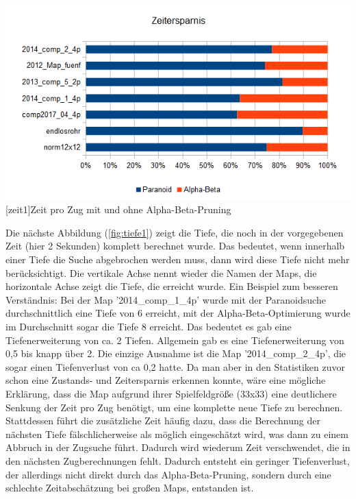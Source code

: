 \documentclass[12pt,a4paper,bibliography=totocnumbered,listof=totocnumbered]{scrartcl}
\begin{document}
    \vspace{1em}
    \begin{minipage}{\linewidth}
    	\centering
    	\includegraphics[width=1\linewidth]{pics/Kapitel_4/ZeitParaAlpha.png}
    	[zeit1]{Zeit pro Zug mit und ohne Alpha-Beta-Pruning}
    	\label{fig:zeit1}
    \end{minipage}
    \vspace{1em}
  
	 Die nächste Abbildung (\ref{fig:tiefe1}) zeigt die Tiefe, die noch in der vorgegebenen Zeit (hier 2 Sekunden) komplett berechnet wurde. Das bedeutet, wenn innerhalb einer Tiefe die Suche abgebrochen werden muss, dann wird diese Tiefe nicht mehr berücksichtigt. Die vertikale Achse nennt wieder die Namen der Maps, die horizontale Achse zeigt die Tiefe, die erreicht wurde. Ein Beispiel zum besseren Verständnis:\newline
	 Bei der Map '2014\_comp\_1\_4p' wurde mit der Paranoidsuche durchschnittlich eine Tiefe von 6 erreicht, mit der Alpha-Beta-Optimierung wurde im Durchschnitt sogar die Tiefe 8 erreicht. Das bedeutet es gab eine Tiefenerweiterung von ca. 2 Tiefen. \newline
	 Allgemein gab es eine Tiefenerweiterung von 0,5 bis knapp über 2.\newline
	 Die einzige Ausnahme ist die Map '2014\_comp\_2\_4p', die sogar einen Tiefenverlust von ca 0,2 hatte. Da man aber in den Statistiken zuvor schon eine Zustands- und Zeitersparnis erkennen konnte, wäre eine mögliche Erklärung, dass die Map aufgrund ihrer Spielfeldgröße (33x33) eine deutlichere Senkung der Zeit pro Zug benötigt, um eine komplette neue Tiefe zu berechnen. Stattdessen führt die zusätzliche Zeit häufig dazu, dass die Berechnung der nächsten Tiefe fälschlicherweise als möglich eingeschätzt wird, was dann zu einem Abbruch in der Zugsuche führt. Dadurch wird wiederum Zeit verschwendet, die in den nächsten Zugberechnungen fehlt. Dadurch entsteht ein geringer Tiefenverlust, der allerdings nicht direkt durch das Alpha-Beta-Pruning, sondern durch eine schlechte Zeitabschätzung bei großen Maps, entstanden ist. 
	 
\end{document}
